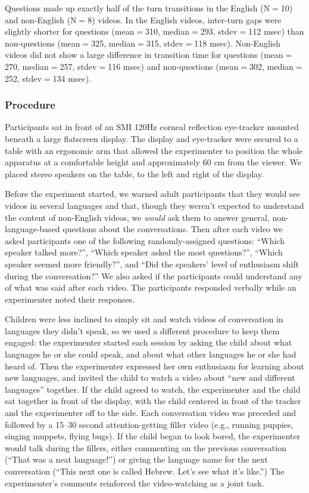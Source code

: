 \documentclass[authoryear, 12pt]{elsarticle}
\begin{document}
Questions made up exactly half of the turn transitions in the English (N$=$10) and non-English (N$=$8) videos. In the English videos, inter-turn gaps were slightly shorter for questions (mean$=$310, median$=$293, stdev$=$112 msec) than non-questions (mean$=$325, median$=$315, stdev$=$118 msec). Non-English videos did not show a large difference in transition time for questions (mean$=$270, median$=$257, stdev$=$116 msec) and non-questions (mean$=$302, median$=$252, stdev$=$134 msec).

\subsubsection*{Procedure}
Participants sat in front of an SMI 120Hz corneal reflection eye-tracker mounted beneath a large flatscreen display. The display and eye-tracker were secured to a table with an ergonomic arm that allowed the experimenter to position the whole apparatus at a comfortable height and approximately 60 cm from the viewer. We placed stereo speakers on the table, to the left and right of the display.

Before the experiment started, we warned adult participants that they would see videos in several languages and that, though they weren't expected to understand the content of non-English videos, we \textit{would} ask them to answer general, non-language-based questions about the conversations. Then after each video we asked participants one of the following randomly-assigned questions: ``Which speaker talked more?'', ``Which speaker asked the most questions?'', ``Which speaker seemed more friendly?'', and ``Did the speakers' level of enthusiasm shift during the conversation?'' We also asked if the participants could understand any of what was said after each video. The participants responded verbally while an experimenter noted their responses.

Children were less inclined to simply sit and watch videos of conversation in languages they didn't speak, so we used a different procedure to keep them engaged: the experimenter started each session by asking the child about what languages he or she could speak, and about what other languages he or she had heard of. Then the experimenter expressed her own enthusiasm for learning about new languages, and invited the child to watch a video about ``new and different languages'' together. If the child agreed to watch, the experimenter and the child sat together in front of the display, with the child centered in front of the tracker and the experimenter off to the side. Each conversation video was preceded and followed by a 15--30 second attention-getting filler video (e.g., running puppies, singing muppets, flying bugs). If the child began to look bored, the experimenter would talk during the fillers, either commenting on the previous conversation (``That was a neat language!'') or giving the language name for the next conversation (``This next one is called Hebrew. Let's see what it's like.'') The experimenter's comments reinforced the video-watching as a joint task.
\end{document}

